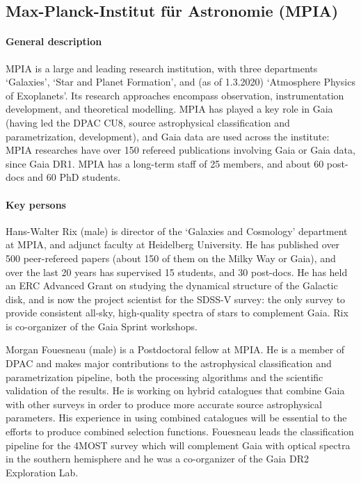 \subsection{Max-Planck-Institut f\"ur Astronomie (MPIA)}
\label{sec:mpg}

\paragraph{General description}
MPIA is a large and leading research institution, with three departments `Galaxies', `Star and Planet Formation', and (as of 1.3.2020) `Atmosphere Physics of Exoplanets'. Its research approaches encompass observation, instrumentation development, and theoretical modelling. MPIA has played a key role in Gaia (having led the DPAC CU8, source astrophysical classification and parametrization, development), and Gaia data are used across the institute: MPIA researches have over 150 refereed publications involving Gaia or Gaia data, since Gaia DR1. MPIA has a long-term staff of 25 members, and about 60 post-docs and 60 PhD students.

\paragraph{Key persons} 
Hans-Walter Rix (male) is director of the `Galaxies and Cosmology' department at MPIA, and adjunct faculty at Heidelberg University. He has published over 500 peer-refereed papers (about 150 of them on the Milky Way or Gaia), and over the last 20 years has supervised 15 students, and 30 post-docs. He has held an ERC Advanced Grant on studying the dynamical structure of the Galactic disk, and is now the project scientist for the SDSS-V survey: the only survey to provide consistent all-sky, high-quality spectra of stars to complement Gaia. Rix is co-organizer of the Gaia Sprint workshops.

Morgan Fouesneau (male) is a Postdoctoral fellow at MPIA. He is a member of DPAC and makes major contributions to the astrophysical classification and parametrization pipeline, both the processing algorithms and the scientific validation of the results. He is working on hybrid catalogues that combine Gaia with other surveys in order to produce more accurate source astrophysical parameters. His experience in using combined catalogues will be essential to the efforts to produce combined selection functions. Fouesneau leads the classification pipeline for the 4MOST survey which will complement Gaia with optical spectra in the southern hemisphere and he was a co-organizer of the Gaia DR2 Exploration Lab.

